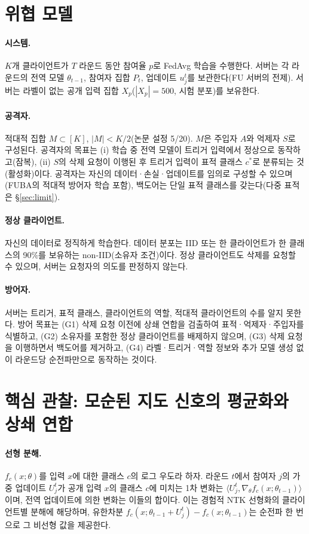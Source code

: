 \documentclass[10pt,a4paper]{article}
\begin{document}
\section{위협 모델}\label{sec:threat}
\paragraph{시스템.} $K$개 클라이언트가 $T$ 라운드 동안 참여율 $p$로 FedAvg 학습을 수행한다. 서버는 각 라운드의 전역 모델 $\theta_{t-1}$, 참여자 집합 $P_t$, 업데이트 $u_j^t$를 보관한다(FU 서버의 전제). 서버는 라벨이 없는 공개 입력 집합 $X_p$($|X_p|=500$, 시험 분포)를 보유한다.
\paragraph{공격자.} 적대적 집합 $M\subset[K]$, $|M|<K/2$(논문 설정 5/20). $M$은 주입자 $A$와 억제자 $S$로 구성된다. 공격자의 목표는 (i) 학습 중 전역 모델이 트리거 입력에서 정상으로 동작하고(잠복), (ii) $S$의 삭제 요청이 이행된 후 트리거 입력이 표적 클래스 $c^*$로 분류되는 것(활성화)이다. 공격자는 자신의 데이터·손실·업데이트를 임의로 구성할 수 있으며(FUBA의 적대적 방어자 학습 포함), 백도어는 단일 표적 클래스를 갖는다(다중 표적은 \S\ref{sec:limit}).
\paragraph{정상 클라이언트.} 자신의 데이터로 정직하게 학습한다. 데이터 분포는 IID 또는 한 클라이언트가 한 클래스의 90\%를 보유하는 non-IID(소유자 조건)이다. 정상 클라이언트도 삭제를 요청할 수 있으며, 서버는 요청자의 의도를 판정하지 않는다.
\paragraph{방어자.} 서버는 트리거, 표적 클래스, 클라이언트의 역할, 적대적 클라이언트의 수를 알지 못한다. 방어 목표는 (G1) 삭제 요청 이전에 상쇄 연합을 검출하여 표적·억제자·주입자를 식별하고, (G2) 소유자를 포함한 정상 클라이언트를 배제하지 않으며, (G3) 삭제 요청을 이행하면서 백도어를 제거하고, (G4) 라벨·트리거·역할 정보와 추가 모델 생성 없이 라운드당 순전파만으로 동작하는 것이다.

\section{핵심 관찰: 모순된 지도 신호의 평균화와 상쇄 연합}\label{sec:obs}
\paragraph{선형 분해.} $f_c(x;\theta)$를 입력 $x$에 대한 클래스 $c$의 로그 우도라 하자. 라운드 $t$에서 참여자 $j$의 가중 업데이트 $U_j^t$가 공개 입력 $x$의 클래스 $c$에 미치는 1차 변화는 $\langle U_j^t,\nabla_\theta f_c(x;\theta_{t-1})\rangle$이며, 전역 업데이트에 의한 변화는 이들의 합이다. 이는 경험적 NTK 선형화의 클라이언트별 분해에 해당하며, 유한차분 $f_c(x;\theta_{t-1}+U_j^t)-f_c(x;\theta_{t-1})$는 순전파 한 번으로 그 비선형 값을 제공한다.
\end{document}

